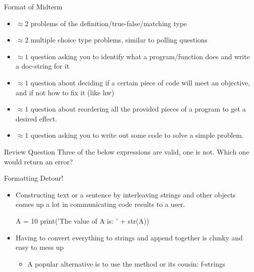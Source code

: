 \documentclass[pdf, aspectratio=169, 12pt]{beamer}
\begin{document}
\begin{frame}{Format of Midterm}
	\begin{itemize}
		\item $\approx2$ problems of the definition/true-false/matching type
		\item $\approx2$ multiple choice type problems, similar to polling questions
		\item $\approx1$ question asking you to identify what a program/function does and write a doc-string for it
		\item $\approx1$ question about deciding if a certain piece of code will meet an objective, and if not how to fix it (like hw)
		\item $\approx1$ question about reordering all the provided pieces of a program to get a desired effect.
		\item $\approx1$ question asking you to write out some code to solve a simple problem.
	\end{itemize}
\end{frame}

\begin{frame}[fragile]{Review Question}
	Three of the below expressions are valid, one is not. Which one would return an error?
	\begin{poll}
	\item {}
	\item {}
	\item {}
	\item {}
	\end{poll}
\end{frame}

\begin{frame}[fragile]{Formatting Detour!}
	\begin{itemize}
		\item<+-> Constructing text or a sentence by interleaving strings and other objects comes up a lot in communicating code results to a user.
			\begin{pythoncode}
				A = 10
				print('The value of A is: ' + str(A))
			\end{pythoncode}
		\item<+-> Having to convert everything to strings and append together is clunky and easy to mess up
			\begin{itemize}
				\item A popular alternative is to use the  method or its cousin: f-strings
			\end{itemize}
	\end{itemize}
\end{frame}
\end{document}
